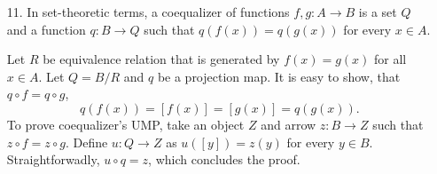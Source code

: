 \documentclass[12pt]{article}
\theoremstyle{definition}
\begin{document}
\begin{enumerate}
    \newtheorem*{noninjective-poset}{Example of non-injective poset}
    \begin{noninjective-poset}
      Not done.
    \end{noninjective-poset}

  \item[11.]
    In set-theoretic terms, a coequalizer of functions $f, g : A \to B$ is a set $Q$ and a function $q : B \to Q$ such that $q(f(x)) = q(g(x))$ for every $x \in A$.
    \begin{figure}[H]
      \centering
    \end{figure}
    Let $R$ be equivalence relation that is generated by $f(x) = g(x)$ for all $x \in A$. Let $Q = B/R$ and $q$ be a projection map. It is easy to show, that $q \circ f = q \circ g$, $$q(f(x)) = [f(x)] = [g(x)] = q(g(x)).$$ To prove coequalizer's UMP, take an object $Z$ and arrow $z : B \to Z$ such that $z \circ f = z \circ g$. Define $u : Q \to Z$ as $u([y]) = z(y)$ for every $y \in B$. Straightforwadly, $u \circ q = z$, which concludes the proof.
\end{enumerate}
\end{document}
